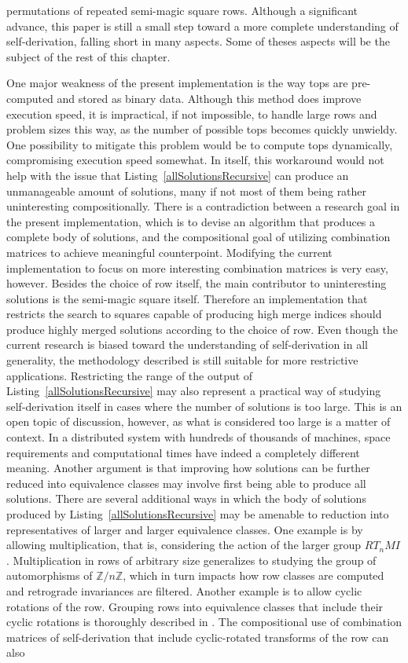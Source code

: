 permutations of repeated semi-magic square rows. Although a significant advance, this paper is still a small step toward a more complete understanding of self-derivation, falling short in many aspects. Some of theses aspects will be the subject of the rest of this chapter.

One major weakness of the present implementation is the way tops are pre-computed and stored as binary data. Although this method does improve execution speed, it is impractical, if not impossible, to handle large rows and problem sizes this way, as the number of possible tops becomes quickly unwieldy. One possibility to mitigate this problem would be to compute tops dynamically, compromising execution speed somewhat. In itself, this workaround would not help with the issue that Listing~\ref{allSolutionsRecursive} can produce an unmanageable amount of solutions, many if not most of them being rather uninteresting compositionally. There is a contradiction between a research goal in the present implementation, which is to devise an algorithm that produces a complete body of solutions, and the compositional goal of utilizing combination matrices to achieve meaningful counterpoint. Modifying the current implementation to focus on more interesting combination matrices is very easy, however. Besides the choice of row itself, the main contributor to uninteresting solutions is the semi-magic square itself. Therefore an implementation that restricts the search to squares capable of producing high merge indices should produce highly merged solutions according to the choice of row. Even though the current research is biased toward the understanding of self-derivation in all generality, the methodology described is still suitable for more restrictive applications. Restricting the range of the output of Listing~\ref{allSolutionsRecursive} may also represent a practical way of studying self-derivation itself in cases where the number of solutions is too large. This is an open topic of discussion, however, as what is considered too large is a matter of context. In a distributed system with hundreds of thousands of machines, space requirements and computational times have indeed a completely different meaning. Another argument is that improving how solutions can be further reduced into equivalence classes may involve first being able to produce all solutions. There are several additional ways in which the body of solutions produced by Listing~\ref{allSolutionsRecursive} may be amenable to reduction into representatives of larger and larger equivalence classes. One example is by allowing multiplication, that is, considering the action of the larger group $RT_nMI$. Multiplication in rows of arbitrary size generalizes to studying the group of automorphisms of $\mathbb{Z} / n \mathbb{Z}$, which in turn impacts how row classes are computed and retrograde invariances are filtered. Another example is to allow cyclic rotations of the row. Grouping rows into equivalence classes that include their cyclic rotations is thoroughly described in \cite{FripertingerLackner2015}. The compositional use of combination matrices of self-derivation that include cyclic-rotated transforms of the row can also 